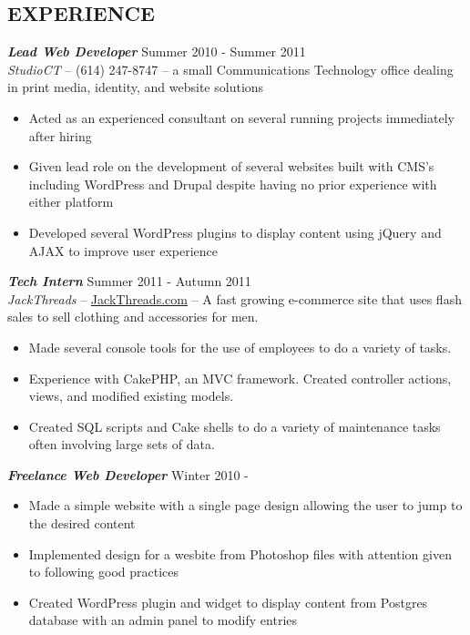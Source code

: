 \documentclass[line,margin=.2,letterpaper]{resume}
\begin{document}
\begin{resume}
\section{\uppercase{Experience}} {\sl\textbf{Lead Web Developer}} \hfill Summer 2010 - Summer 2011\\
	\emph{StudioCT} -- (614) 247-8747 -- a small Communications Technology office dealing in print media, identity, 
	and website solutions 
	\vspace{5pt}
	\begin{itemize}  
	    \item Acted as an experienced consultant on several running projects immediately after hiring
	    \item Given lead role on the development of several websites built with CMS's including WordPress and Drupal despite having no prior experience with either platform
	    \item Developed several WordPress plugins to display content using jQuery and AJAX to improve user experience
	\end{itemize}

	{\sl\textbf{Tech Intern}} \hfill Summer 2011 - Autumn 2011 \\
	\emph{JackThreads} -- \href{http://www.jackthreads.com/}{JackThreads.com}  -- A fast growing e-commerce site that uses flash sales to sell clothing and accessories for men.
	\vspace{5pt}
	 \begin{itemize}  
	     \item Made several console tools for the use of employees to do a variety of tasks.
	     \item Experience with CakePHP, an MVC framework. Created controller actions, views, and modified existing models.
	     \item Created SQL scripts and Cake shells to do a variety of maintenance tasks often involving large sets of data.
	 \end{itemize} 

	{\sl\textbf{Freelance Web Developer}} \hfill Winter 2010 - \\
	\vspace{-8pt}
	 \begin{itemize}  
	     \item Made a simple website with a single page design allowing the user to jump to the desired content
	     \item Implemented design for a wesbite from Photoshop files with attention given to following good practices
	     \item Created WordPress plugin and widget to display content from Postgres database with an admin panel to modify entries
	 \end{itemize} 
                 

\end{resume}
\end{document}
